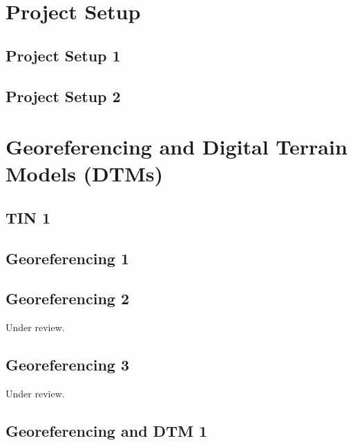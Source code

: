 \documentclass{scrartcl}
\begin{document}
\section{Project Setup}
\label{sec:project_setup}

\subsection{Project Setup 1}
\label{sec:project_setup_1}
\clearpage

\subsection{Project Setup 2}
\label{sec:project_setup_2}
\clearpage

\section{Georeferencing and Digital Terrain Models (DTMs)}
\label{sec:georeferencing_and_dtms}

\subsection{TIN 1}
\label{sec:tin_1}
\clearpage

\subsection{Georeferencing 1}
\label{sec:georeferencing_1}
\clearpage

\subsection{Georeferencing 2} %
\label{sec:georeferencing_3}
Under review.%
\clearpage

\subsection{Georeferencing 3} %
\label{sec:georeferencing_4}
Under review.%
\clearpage

\subsection{Georeferencing and DTM 1}
\label{sec:georef_tin_1}
\clearpage
\end{document}
